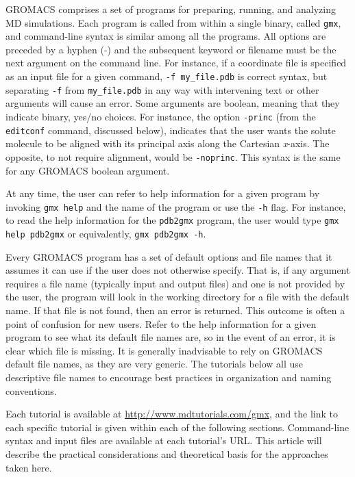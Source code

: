 \documentclass[9pt,tutorial,pubversion]{livecoms}
\newcommand{\urlstring}{http://www.mdtutorials.com/gmx}
\newcommand{\tutorialhomeurl}{\url{\urlstring}}
\begin{document}
GROMACS comprises a set of programs for preparing, running, and analyzing MD simulations. Each program is called from within a single binary, called \texttt{gmx}, and command-line syntax is similar among all the programs. All options are preceded by a hyphen (-) and the subsequent keyword or filename must be the next argument on the command line. For instance, if a coordinate file is specified as an input file for a given command, \texttt{-f my\_file.pdb} is correct syntax, but separating \texttt{-f} from \texttt{my\_file.pdb} in any way with intervening text or other arguments will cause an error. Some arguments are boolean, meaning that they indicate binary, yes/no choices. For instance, the option \texttt{-princ} (from the \texttt{editconf} command, discussed below), indicates that the user wants the solute molecule to be aligned with its principal axis along the Cartesian {\em x}-axis. The opposite, to not require alignment, would be \texttt{-noprinc}. This syntax is the same for any GROMACS boolean argument.

At any time, the user can refer to help information for a given program by invoking \texttt{gmx help} and the name of the program or use the \texttt{-h} flag. For instance, to read the help information for the \texttt{pdb2gmx} program, the user would type \texttt{gmx help pdb2gmx} or equivalently, \texttt{gmx pdb2gmx -h}.

Every GROMACS program has a set of default options and file names that it assumes it can use if the user does not otherwise specify. That is, if any argument requires a file name (typically input and output files) and one is not provided by the user, the program will look in the working directory for a file with the default name. If that file is not found, then an error is returned. This outcome is often a point of confusion for new users. Refer to the help information for a given program to see what its default file names are, so in the event of an error, it is clear which file is missing. It is generally inadvisable to rely on GROMACS default file names, as they are very generic. The tutorials below all use descriptive file names to encourage best practices in organization and naming conventions.

Each tutorial is available at \tutorialhomeurl, and the link to each specific tutorial is given within each of the following sections. Command-line syntax and input files are available at each tutorial's URL. This article will describe the practical considerations and theoretical basis for the approaches taken here.
\end{document}
